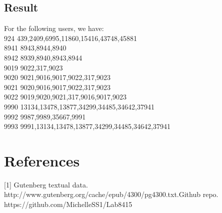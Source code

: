 \documentclass[11pt]{article}
\begin{document}
\begin{justifying}
\subsection{Result}
For the following users, we have:\\
924 	439,2409,6995,11860,15416,43748,45881\\
8941	8943,8944,8940\\
8942	8939,8940,8943,8944\\
9019	9022,317,9023\\
9020	9021,9016,9017,9022,317,9023\\
9021	9020,9016,9017,9022,317,9023\\
9022	9019,9020,9021,317,9016,9017,9023\\
9990	13134,13478,13877,34299,34485,34642,37941\\
9992	9987,9989,35667,9991\\
9993	9991,13134,13478,13877,34299,34485,34642,37941



\end{justifying}

\section{References}
[1] Gutenberg textual data. http://www.gutenberg.org/cache/epub/4300/pg4300.txt.\newline
[2] Github repo. https://github.com/MichelleSS1/Lab8415
\end{document}
